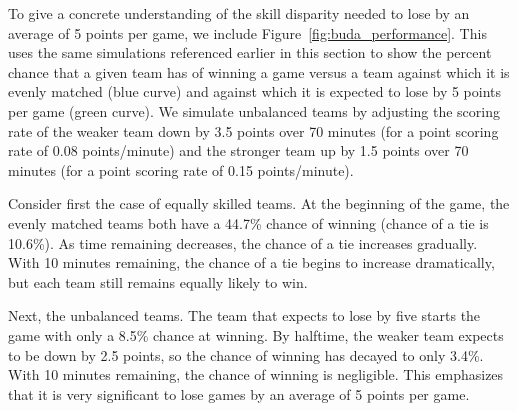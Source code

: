 To give a concrete understanding of the skill disparity needed to lose by an average of 5 points per game, we include Figure~\ref{fig:buda_performance}.  This uses the same simulations referenced earlier in this section to show the percent chance that a given team has of winning a game versus a team against which it is evenly matched (blue curve) and against which it is expected to lose by 5 points per game (green curve). We simulate unbalanced teams by adjusting the scoring rate of the weaker team down by 3.5 points over 70 minutes (for a point scoring rate of 0.08 points/minute) and the stronger team up by 1.5 points over 70 minutes (for a point scoring rate of 0.15 points/minute). 

Consider first the case of equally skilled teams.  At the beginning of the game, the evenly matched teams both have a 44.7\% chance of winning (chance of a tie is 10.6\%). As time remaining decreases, the chance of a tie increases gradually. With 10 minutes remaining, the chance of a tie begins to increase dramatically, but each team still remains equally likely to win.

Next, the unbalanced teams.  The team that expects to lose by five starts the game with only a 8.5\% chance at winning.  By halftime, the weaker team expects to be down by 2.5 points, so the chance of winning has decayed to only 3.4\%.  With 10 minutes remaining, the chance of winning is negligible. This emphasizes that it is very significant to lose games by an average of 5 points per game.